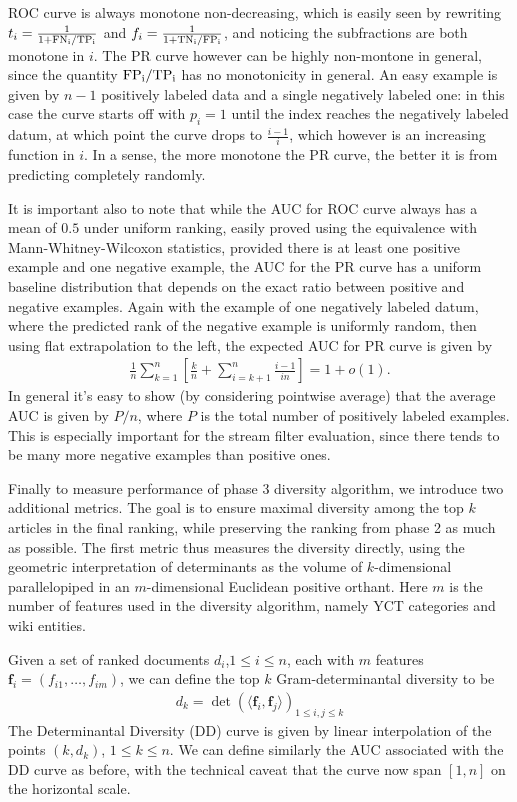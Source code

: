 ROC curve is always monotone non-decreasing, which is easily seen by rewriting $t_i = \frac{1}{1 + \rm{FN}_i / \rm{TP}_i}$ and $f_i = \frac{1}{1 + \rm{TN}_i / \rm{FP}_i}$, and noticing the subfractions are both monotone in $i$. The PR curve however can be highly non-montone in general, since the quantity $\rm{FP}_i / \rm{TP}_i$ has no monotonicity in general. An easy example is given by $n-1$ positively labeled data and a single negatively labeled one: in this case the curve starts off with $p_i =1$ until the index reaches the negatively labeled datum, at which point the curve drops to $\frac{i-1}{i}$, which however is an increasing function in $i$. In a sense, the more monotone the PR curve, the better it is from predicting completely randomly.


It is important also to note that while the AUC for ROC curve always has a mean of $0.5$ under uniform ranking, easily proved using the equivalence with Mann-Whitney-Wilcoxon statistics, provided there is at least one positive example and one negative example,  the AUC for the PR curve has a uniform baseline distribution that depends on the exact ratio between positive and negative examples. Again with the example of one negatively labeled datum, where the predicted rank of the negative example is uniformly random, then using flat extrapolation to the left, the expected AUC for PR curve is given by 
\begin{align*}
\frac{1}{n} \sum_{k=1}^n [\frac{k}{n} + \sum_{i=k+1}^n \frac{i-1}{in}] = 1 + o(1).
\end{align*}
In general it's easy to show (by considering pointwise average) that the average AUC is given by $P/n$, where $P$ is the total number of positively labeled examples. This is especially important for the stream filter evaluation, since there tends to be many more negative examples than positive ones. 

Finally to measure performance of phase 3 diversity algorithm, we introduce two additional metrics. The goal is to ensure maximal diversity among the top $k$ articles in the final ranking, while preserving the ranking from phase 2 as much as possible. The first metric thus measures the diversity directly, using the geometric interpretation of determinants as the volume of $k$-dimensional parallelopiped in an $m$-dimensional Euclidean positive orthant. Here $m$ is the number of features used in the diversity algorithm, namely YCT categories and wiki entities.
\begin{definition}
Given a set of ranked documents $d_i$,$ 1 \le i \le n$, each with $m$ features $\mathbf{f}_i = (f_{i1}, \ldots, f_{im})$,  we can define the top $k$ Gram-determinantal diversity to be 
\begin{align*}
d_k = \det (\langle \mathbf{f}_i , \mathbf{f}_j \rangle)_{1\le i,j \le k}
\end{align*}
The Determinantal Diversity (DD) curve is given by linear interpolation of the points $(k,d_k)$, $1 \le k \le n$. We can define similarly the AUC associated with the DD curve as before, with the technical caveat that the curve now span $[1,n]$ on the horizontal scale.
\end{definition}
 
